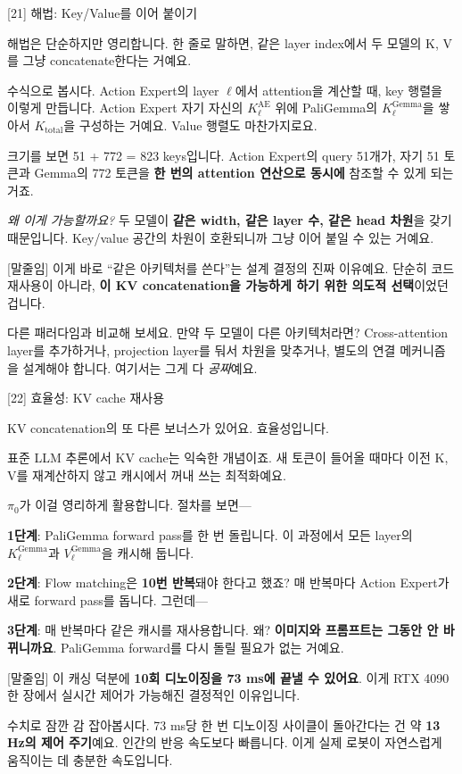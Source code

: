 \documentclass[aspectratio=169,10pt]{beamer}
\newenvironment{script}{%
  \footnotesize
  \setlength{\parskip}{0.5em}
  \setlength{\parindent}{0pt}
}{}
\begin{document}
\begin{frame}{[21] 해법: Key/Value를 이어 붙이기}
\begin{script}
해법은 단순하지만 영리합니다. 한 줄로 말하면, \alert{같은 layer index에서 두 모델의 K, V를 그냥 concatenate한다}는 거예요.

수식으로 봅시다. Action Expert의 layer $\ell$에서 attention을 계산할 때, key 행렬을 이렇게 만듭니다. Action Expert 자기 자신의 $K^\text{AE}_\ell$ 위에 PaliGemma의 $K^\text{Gemma}_\ell$을 쌓아서 \alert{$K_\text{total}$}을 구성하는 거예요. Value 행렬도 마찬가지로요.

크기를 보면 51 + 772 = \alert{823 keys}입니다. Action Expert의 query 51개가, 자기 51 토큰과 Gemma의 772 토큰을 \textbf{한 번의 attention 연산으로 동시에} 참조할 수 있게 되는 거죠.

\textit{왜 이게 가능할까요?} 두 모델이 \textbf{같은 width, 같은 layer 수, 같은 head 차원}을 갖기 때문입니다. Key/value 공간의 차원이 호환되니까 그냥 이어 붙일 수 있는 거예요.

[말줄임] 이게 바로 ``같은 아키텍처를 쓴다''는 설계 결정의 진짜 이유예요. 단순히 코드 재사용이 아니라, \textbf{이 KV concatenation을 가능하게 하기 위한 의도적 선택}이었던 겁니다.

다른 패러다임과 비교해 보세요. 만약 두 모델이 다른 아키텍처라면? Cross-attention layer를 추가하거나, projection layer를 둬서 차원을 맞추거나, 별도의 연결 메커니즘을 설계해야 합니다. 여기서는 그게 다 \emph{공짜}예요.
\end{script}
\end{frame}

\begin{frame}{[22] 효율성: KV cache 재사용}
\begin{script}
KV concatenation의 또 다른 보너스가 있어요. 효율성입니다.

표준 LLM 추론에서 KV cache는 익숙한 개념이죠. 새 토큰이 들어올 때마다 이전 K, V를 재계산하지 않고 캐시에서 꺼내 쓰는 최적화예요.

$\pi_0$가 이걸 영리하게 활용합니다. 절차를 보면---

\textbf{1단계}: PaliGemma forward pass를 한 번 돌립니다. 이 과정에서 모든 layer의 $K^\text{Gemma}_\ell$과 $V^\text{Gemma}_\ell$을 캐시해 둡니다.

\textbf{2단계}: Flow matching은 \textbf{10번 반복}돼야 한다고 했죠? 매 반복마다 Action Expert가 새로 forward pass를 돕니다. 그런데---

\textbf{3단계}: 매 반복마다 \alert{같은 캐시를 재사용}합니다. 왜? \textbf{이미지와 프롬프트는 그동안 안 바뀌니까요}. PaliGemma forward를 다시 돌릴 필요가 없는 거예요.

[말줄임] 이 캐싱 덕분에 \textbf{10회 디노이징을 73 ms에 끝낼 수 있어요}. 이게 RTX 4090 한 장에서 실시간 제어가 가능해진 결정적인 이유입니다.

수치로 잠깐 감 잡아봅시다. 73 ms당 한 번 디노이징 사이클이 돌아간다는 건 약 \textbf{13 Hz의 제어 주기}예요. 인간의 반응 속도보다 빠릅니다. 이게 실제 로봇이 자연스럽게 움직이는 데 충분한 속도입니다.
\end{script}
\end{frame}
\end{document}
